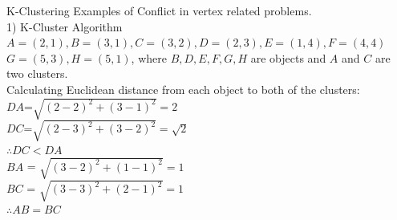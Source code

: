 \begin{frame}{K-Clustering}
  Examples of Conflict in vertex related problems.\\
  1) K-Cluster Algorithm\\
  $A=(2,1), B=(3,1), C=(3,2), D=(2,3), E=(1,4), F=(4,4)$\\
  $G=(5,3), H=(5,1)$, where $B, D, E, F, G, H$ are objects
  and $A$ and $C$ are two clusters.\\
  Calculating Euclidean distance from each object to both of the clusters:\\
  $DA$=$\sqrt{{(2-2)}^2+{(3-1)}^2}=2$\\
  $DC$=$\sqrt{{(2-3)}^2+{(3-2)}^2}=\sqrt{2}$\\
  $\therefore DC<DA$\\
  $BA$ = $\sqrt{{(3-2)}^2+{(1-1)}^2}=1$\\
  $BC$ = $\sqrt{{(3-3)}^2+{(2-1)}^2}=1$\\
  $\therefore AB=BC$\\
\end{frame}
